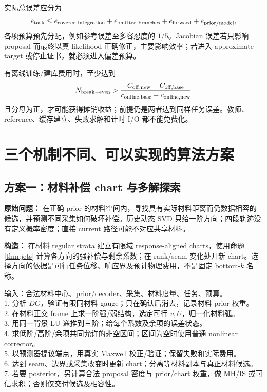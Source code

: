 实际总误差应分为
\[
e_{\rm task}\le
e_{\rm covered\;integration}
+e_{\rm omitted\;branches}
+e_{\rm forward}
+e_{\rm prior/model},
\]
各项预算预先分配，例如参考误差至多容忍度的 $1/5$。Jacobian 误差若只影响 proposal 而最终以真 likelihood 正确修正，主要影响效率；若进入 approximate target 或停止证书，就必须进入偏差预算。

有离线训练/建库费用时，至少达到
\[
N_{\rm break-even}>
\frac{C_{\rm off,new}-C_{\rm off,base}}
{c_{\rm online,base}-c_{\rm online,new}}
\]
且分母为正，才可能获得摊销收益；前提仍是两者达到同样任务误差。教师、reference、缓存建立、失败求解和计时 I/O 都不能免费化。

\section{三个机制不同、可以实现的算法方案}
\label{sec:algorithms}

\subsection{方案一：材料补偿 chart 与多解探索}
\textbf{原始问题：} 在正确 prior 的材料空间内，寻找具有实际材料距离而仍数据相容的候选，并预测不同采集如何破坏补偿。历史动态 SVD 只给一阶方向；四段轨迹没有定义概率密度；直接 current 路径可能不对应共享材料。

\textbf{构造：} 在材料 regular strata 建立有限域 response-aligned charts，使用命题 \ref{thm:jets} 计算各方向的强补偿与剩余系数；在 rank/seam 变化处开新 chart。选择方向的依据是可行任务位移、响应界及预计物理费用，不是固定 bottom-$k$ 名称。

\begin{tcolorbox}[title={算法 1：compensated material chart}]
输入：合法材料中心、prior/decoder、采集、材料度量、任务、预算。\\
1. 分析 $DG$，验证有限同材料 gauge；只在确认后消去，记录材料 prior 权重。\\
2. 在材料正交 frame 上求一阶强/弱结构，选定可行 $v,U$，归一化材料弧。\\
3. 用同一背景 LU 递推到三阶；给每个系数及余项的误差状态。\\
4. 求低阶/高阶/余项共同允许的非空区间；区间为空时使用普通 nonlinear corrector。\\
5. 以预测器提议端点，用真实 Maxwell 校正/验证；保留失败和实际费用。\\
6. 达到 seam、边界或采集改变时更新 chart；分离等材料副本与真正材料候选。\\
7. 若要 posterior，另计算合法 proposal 密度与 prior/chart 权重，做 MH/IS 或可信求积；否则仅交付候选及相容性。
\end{tcolorbox}

